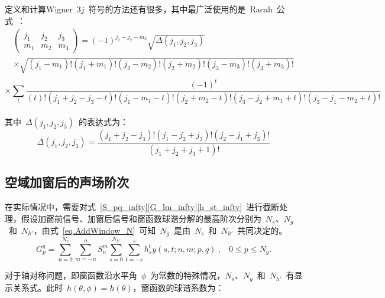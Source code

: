 定义和计算Wigner~$3j$~符号的方法还有很多，其中最广泛使用的是~Racah~公式~：
\begin{equation}
\begin{array}{l}
\left(\begin{array}{ccc}
j_{1} & j_{2} & j_{3} \\
m_{1} & m_{2} & m_{3}
\end{array}\right)
=(-1)^{j_{1}-j_{2}-m_{3}} \sqrt{\Delta\left(j_{1}, j_{2}, j_{3}\right)} \\
\times \sqrt{\left(j_{1}-m_{1}\right) !\left(j_{1}+m_{1}\right) !\left(j_{2}-m_{2}\right) !\left(j_{2}+m_{2}\right) !\left(j_{3}-m_{3}\right) !\left(j_{3}+m_{3}\right) !} \\
\end{array}
\end{equation}
\begin{equation*}
\times \sum_{t} \frac{(-1)^{t}}{(t) !\left(j_{1}+j_{2}-j_{3}-t\right) !\left(j_{1}-m_{1}-t\right) !\left(j_{2}+m_{2}-t\right) !\left(j_{3}-j_{2}+m_{1}+t\right) !\left(j_{3}-j_{1}-m_{2}+t\right) !}
\end{equation*}
\\
其中~$\Delta\left(j_{1}, j_{2}, j_{3}\right)$~的表达式为：
\begin{equation*}
\Delta\left(j_{1}, j_{2}, j_{3}\right)=\frac{\left(j_{1}+j_{2}-j_{3}\right) !\left(j_{1}-j_{2}+j_{3}\right) !\left(j_{2}-j_{1}+j_{3}\right) !}{\left(j_{1}+j_{2}+j_{3}+1\right) !}
\end{equation*}

\subsection{空域加窗后的声场阶次}\label{sec.Enlarge_order}

在实际情况中，需要对式~\eqref{S_pq_infty}\eqref{G_lm_infty}\eqref{h_st_infty}~进行截断处理，假设加窗前信号、加窗后信号和窗函数球谐分解的最高阶次分别为~$N_{s}$、$N_{g}$~和~$N_{h'}$，由式~\eqref{eq.AddWindow_N}~可知~$N_{g}$~是由~$N_{s}$~和~$N_{h'}$~共同决定的。
\begin{equation}\label{eq.AddWindow_N}
G_{p}^{q} = \sum_{n=0}^{N_{s}} \sum_{m=-n}^{n} S_{n}^{m}\sum_{s=0}^{N_{h'}} \sum_{t=-s}^{s} h_{s}^{t}y(s,t;n,m;p,q)~,~~~~ 0\leq p \leq N_{g}.
\end{equation}

对于轴对称问题，即窗函数沿水平角~$\phi$~为常数的特殊情况，$N_{s}$、$N_{g}$~和~$N_{h'}$~有显示关系式。此时~$h(\theta,\phi) =h(\theta)$，窗函数的球谐系数为：

